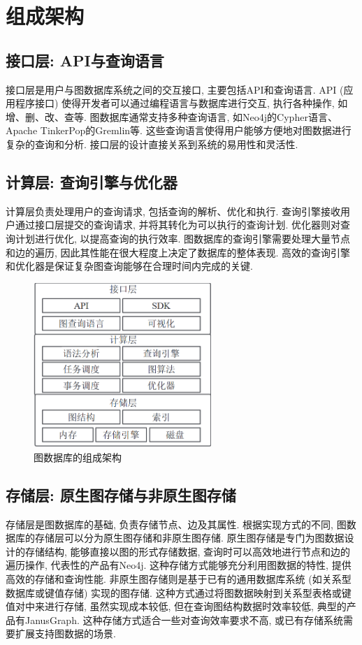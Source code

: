 \section{组成架构}

\subsection{接口层: API与查询语言}

接口层是用户与图数据库系统之间的交互接口, 主要包括API和查询语言. API (应用程序接口) 使得开发者可以通过编程语言与数据库进行交互, 执行各种操作, 如增、删、改、查等. 图数据库通常支持多种查询语言, 如Neo4j的Cypher语言、Apache TinkerPop的Gremlin等. 这些查询语言使得用户能够方便地对图数据进行复杂的查询和分析. 接口层的设计直接关系到系统的易用性和灵活性.

\vspace{1cm}
\subsection{计算层: 查询引擎与优化器}

计算层负责处理用户的查询请求, 包括查询的解析、优化和执行. 查询引擎接收用户通过接口层提交的查询请求, 并将其转化为可以执行的查询计划. 优化器则对查询计划进行优化, 以提高查询的执行效率. 图数据库的查询引擎需要处理大量节点和边的遍历, 因此其性能在很大程度上决定了数据库的整体表现. 高效的查询引擎和优化器是保证复杂图查询能够在合理时间内完成的关键.

\begin{figure}[H]
	\centering
	\includegraphics[width=0.6\textwidth]{images/3.png}
	\caption{图数据库的组成架构}
\end{figure}

\subsection{存储层: 原生图存储与非原生图存储}

存储层是图数据库的基础, 负责存储节点、边及其属性. 根据实现方式的不同, 图数据库的存储层可以分为原生图存储和非原生图存储.
原生图存储是专门为图数据设计的存储结构, 能够直接以图的形式存储数据, 查询时可以高效地进行节点和边的遍历操作, 代表性的产品有Neo4j. 这种存储方式能够充分利用图数据的特性, 提供高效的存储和查询性能.
非原生图存储则是基于已有的通用数据库系统 (如关系型数据库或键值存储) 实现的图存储. 这种方式通过将图数据映射到关系型表格或键值对中来进行存储, 虽然实现成本较低, 但在查询图结构数据时效率较低, 典型的产品有JanusGraph. 这种存储方式适合一些对查询效率要求不高, 或已有存储系统需要扩展支持图数据的场景.